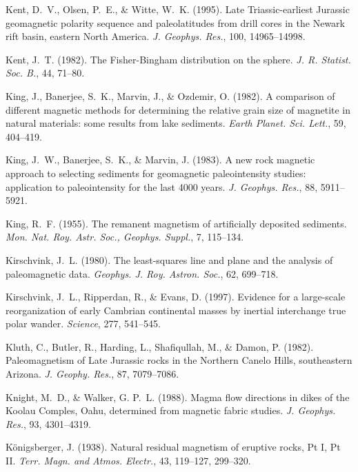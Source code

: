 \documentclass[,plain]{tauxe}
\begin{document}
\begin{thebibliography}{}
\bibitem{}%
Kent, D.~V., Olsen, P.~E., \& Witte, W.~K. (1995).
Late Triassic-earliest Jurassic geomagnetic polarity sequence and paleolatitudes from drill cores in the Newark rift basin, eastern North America.
{\it J. Geophys. Res.}, 100, 14965--14998.

\bibitem{}%
Kent, J.~T. (1982).
The Fisher-Bingham distribution on the sphere.
{\it J. R. Statist. Soc. B.}, 44, 71--80.

\bibitem{}%
King, J., Banerjee, S.~K., Marvin, J., \& Ozdemir, O. (1982).
A comparison of different magnetic methods for determining the relative grain size of magnetite in natural materials: some results from lake sediments.
{\it Earth Planet. Sci. Lett.}, 59, 404--419.

\bibitem{}%
King, J.~W., Banerjee, S.~K., \& Marvin, J. (1983).
A new rock magnetic approach to selecting sediments for geomagnetic paleointensity studies: application to paleointensity for the last 4000 years.
{\it J. Geophys. Res.}, 88, 5911--5921.

\bibitem{}%
King, R.~F. (1955).
The remanent magnetism of artificially deposited sediments.
{\it Mon. Nat. Roy. Astr. Soc., Geophys. Suppl.}, 7, 115--134.

\bibitem{}%
Kirschvink, J.~L. (1980).
The least-squares line and plane and the analysis of paleomagnetic data.
{\it Geophys. J. Roy. Astron. Soc.}, 62, 699--718.

\bibitem{}%
Kirschvink, J.~L., Ripperdan, R., \& Evans, D. (1997).
Evidence for a large-scale reorganization of early Cambrian continental masses by inertial interchange true polar wander.
{\it Science}, 277, 541--545.

\bibitem{}%
Kluth, C., Butler, R., Harding, L., Shafiqullah, M., \& Damon, P. (1982).
Paleomagnetism of Late Jurassic rocks in the Northern Canelo Hills, southeastern Arizona.
{\it J. Geophy. Res.}, 87, 7079--7086.

\bibitem{}%
Knight, M.~D., \& Walker, G. P.~L. (1988).
Magma flow directions in dikes of the Koolau Comples, Oahu, determined from magnetic fabric studies.
{\it J. Geophys. Res.}, 93, 4301--4319.

\bibitem{}%
K\"onigsberger, J. (1938).
Natural residual magnetism of eruptive rocks, Pt I, Pt II.
{\it Terr. Magn. and Atmos. Electr.}, 43, 119--127, 299--320.




\end{thebibliography}
\end{document}
